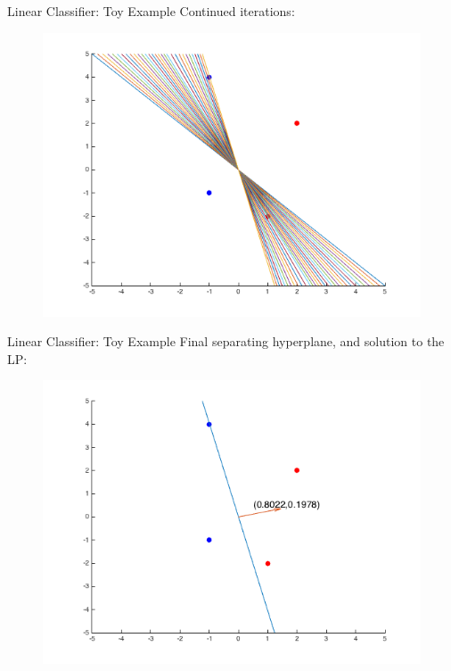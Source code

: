 \documentclass{beamer}
\begin{document}
\begin{frame}{Linear Classifier: Toy Example}
Continued iterations:
\begin{figure}
\includegraphics[width=\textwidth]{ClassifierToy_xAll.png}
\end{figure}
\end{frame}

\begin{frame}{Linear Classifier: Toy Example}
Final separating hyperplane, and solution to the LP:
\begin{figure}
\includegraphics[width=\textwidth]{ClassifierToy_xEnd.png}
\end{figure}
\end{frame}
\end{document}
